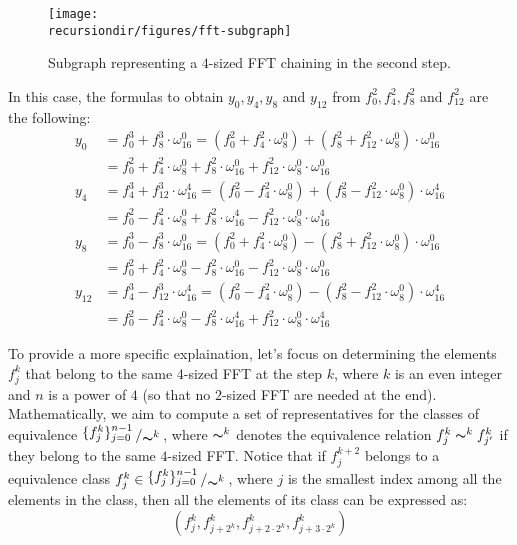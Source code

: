 \begin{figure}[H]
\centering
\texttt{[image: \\recursiondir/figures/fft-subgraph]}
\caption{Subgraph representing a $4$-sized FFT chaining in the second step.}
\label{fig:c12a-proof}
\end{figure}

\newcommand{\bigslant}[2]{{\raisebox{.2em}{$#1$}\left/\raisebox{-.2em}{$#2$}\right.}}

In this case, the formulas to obtain $y_0, y_4, y_8$ and $y_{12}$ from $f_0^2, f_4^2, f_8^2$ and $f_{12}^2$ are the following:
\begin{align*}
y_0 &= f_0^3 + f_8^3 \cdot \omega_{16}^0  = (f_0^2 + f_4^2 \cdot \omega_{8}^0) + (f_8^2 + f_{12}^2 \cdot \omega_{8}^0) \cdot \omega_{16}^0          \\
    & = f_0^2 + f_4^2 \cdot \omega_8^0 + f_8^2 \cdot \omega_{16}^0 + f_{12}^2 \cdot \omega_8^0 \cdot \omega_{16}^0                                  \\
y_4 &= f_4^3 + f_{12}^3 \cdot \omega_{16}^4  = (f_0^2 - f_4^2 \cdot \omega_{8}^0) + (f_8^2 - f_{12}^2 \cdot \omega_{8}^0) \cdot \omega_{16}^4       \\
    & = f_0^2 - f_4^2 \cdot \omega_8^0 + f_8^2 \cdot \omega_{16}^4 - f_{12}^2 \cdot \omega_8^0 \cdot \omega_{16}^4                                  \\
y_8 &= f_0^3 - f_8^3 \cdot \omega_{16}^0  = (f_0^2 + f_4^2 \cdot \omega_{8}^0) - (f_8^2 + f_{12}^2 \cdot \omega_{8}^0) \cdot \omega_{16}^0          \\
    & = f_0^2 + f_4^2 \cdot \omega_8^0 - f_8^2 \cdot \omega_{16}^0 - f_{12}^2 \cdot \omega_8^0 \cdot \omega_{16}^0                                  \\
y_{12} &= f_4^3 - f_{12}^3 \cdot \omega_{16}^4  = (f_0^2 - f_4^2 \cdot \omega_{8}^0) - (f_8^2 - f_{12}^2 \cdot \omega_{8}^0) \cdot \omega_{16}^4    \\
    & = f_0^2 - f_4^2 \cdot \omega_8^0 - f_8^2 \cdot \omega_{16}^4 + f_{12}^2 \cdot \omega_8^0 \cdot \omega_{16}^4                                    
\end{align*}

To provide a more specific explaination, let's focus on determining the elements $f_j^k$ that belong to the same $4$-sized FFT at the step $k$, where $k$ is an even integer and $n$ is a power of $4$ (so that no $2$-sized FFT are needed at the end). Mathematically, we aim to compute a set of representatives for the classes of equivalence $\bigslant{\{f^k_j\}_{j=0}^{n-1}}{\thicksim^k}$, where $\thicksim^k$ denotes the equivalence relation $f_{j}^k \thicksim^k f_{j'}^k$ if they belong to the same $4$-sized FFT. Notice that if $f_j^{k+2}$ belongs to a equivalence class $f_j^k \in \bigslant{\{f^k_j\}_{j=0}^{n-1}}{\thicksim^k}$, where $j$ is the smallest index among all the elements in the class, then all the elements of its class can be expressed as:
\[
\left( f_{j}^{k}, f_{j + 2^{k} }^{k}, f_{j + 2 \cdot 2^{k}}^{k}, f_{j + 3 \cdot 2^{k}} ^{k} \right) 
\]


